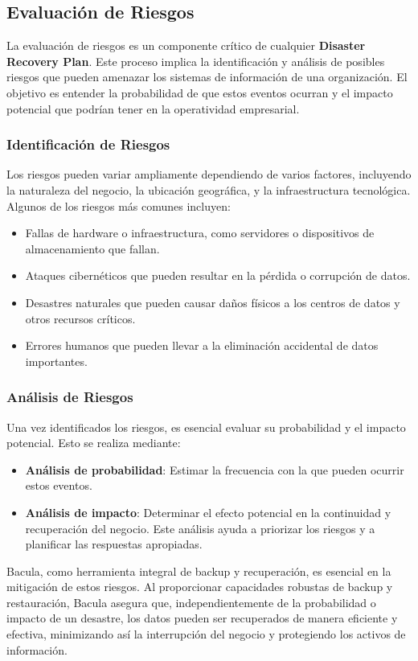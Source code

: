 \subsection{Evaluación de Riesgos}

La evaluación de riesgos es un componente crítico de cualquier \textbf{Disaster Recovery Plan}. Este proceso implica la identificación y análisis de posibles riesgos que pueden amenazar los sistemas de información de una organización. El objetivo es entender la probabilidad de que estos eventos ocurran y el impacto potencial que podrían tener en la operatividad empresarial.

\subsubsection{Identificación de Riesgos}

Los riesgos pueden variar ampliamente dependiendo de varios factores, incluyendo la naturaleza del negocio, la ubicación geográfica, y la infraestructura tecnológica. Algunos de los riesgos más comunes incluyen:

\begin{itemize}
    \item Fallas de hardware o infraestructura, como servidores o dispositivos de almacenamiento que fallan.
    \item Ataques cibernéticos que pueden resultar en la pérdida o corrupción de datos.
    \item Desastres naturales que pueden causar daños físicos a los centros de datos y otros recursos críticos.
    \item Errores humanos que pueden llevar a la eliminación accidental de datos importantes.
\end{itemize}

\subsubsection{Análisis de Riesgos}

Una vez identificados los riesgos, es esencial evaluar su probabilidad y el impacto potencial. Esto se realiza mediante:

\begin{itemize}
    \item \textbf{Análisis de probabilidad}: Estimar la frecuencia con la que pueden ocurrir estos eventos.
    \item \textbf{Análisis de impacto}: Determinar el efecto potencial en la continuidad y recuperación del negocio. Este análisis ayuda a priorizar los riesgos y a planificar las respuestas apropiadas.
\end{itemize}

Bacula, como herramienta integral de backup y recuperación, es esencial en la mitigación de estos riesgos. Al proporcionar capacidades robustas de backup y restauración, Bacula asegura que, independientemente de la probabilidad o impacto de un desastre, los datos pueden ser recuperados de manera eficiente y efectiva, minimizando así la interrupción del negocio y protegiendo los activos de información.

